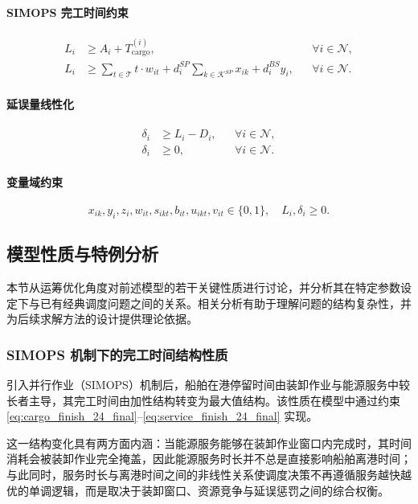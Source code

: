 \documentclass[UTF8, a4paper, 12pt]{ctexart}
\begin{document}
\paragraph{SIMOPS 完工时间约束}
\begin{align}
L_i &\ge A_i + T^{(i)}_{\text{cargo}},
&& \forall i \in \mathcal{N},
\label{eq:cargo_finish_24_final} \\
L_i &\ge 
\sum_{t \in \mathcal{T}} t \cdot w_{it}
+ d_i^{SP}\sum_{k \in \mathcal{K}^{SP}} x_{ik}
+ d_i^{BS} y_i,
&& \forall i \in \mathcal{N}.
\label{eq:service_finish_24_final}
\end{align}

\paragraph{延误量线性化}
\begin{align}
\delta_i &\ge L_i - D_i,
&& \forall i \in \mathcal{N}, \\
\delta_i &\ge 0,
&& \forall i \in \mathcal{N}.
\end{align}

\paragraph{变量域约束}
\begin{equation}
x_{ik},y_i,z_i,w_{it},s_{ikt},b_{it},u_{ikt},v_{it} \in \{0,1\},
\quad
L_i,\delta_i \ge 0.
\end{equation}

\subsection{模型性质与特例分析}
\label{sec:properties}

本节从运筹优化角度对前述模型的若干关键性质进行讨论，并分析其在特定参数设定下与已有经典调度问题之间的关系。相关分析有助于理解问题的结构复杂性，并为后续求解方法的设计提供理论依据。

\subsubsection{SIMOPS 机制下的完工时间结构性质}

引入并行作业（SIMOPS）机制后，船舶在港停留时间由装卸作业与能源服务中较长者主导，其完工时间由加性结构转变为最大值结构。该性质在模型中通过约束
\eqref{eq:cargo_finish_24_final}--\eqref{eq:service_finish_24_final} 实现。

这一结构变化具有两方面内涵：当能源服务能够在装卸作业窗口内完成时，其时间消耗会被装卸作业完全掩盖，因此能源服务时长并不总是直接影响船舶离港时间；与此同时，服务时长与离港时间之间的非线性关系使调度决策不再遵循服务越快越优的单调逻辑，而是取决于装卸窗口、资源竞争与延误惩罚之间的综合权衡。
\end{document}
